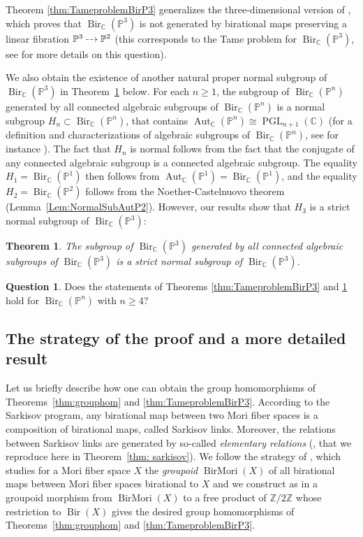 \documentclass[JEP,XML,SOM,Unicode,NoFloatCountersInSection]{cedram}
\newcommand{\dradpl}{{\hspace*{-2mm}\begin{tikzcd}[ampersand replacement=\&,column sep = scriptsize]\mbox{}\ar[r,dashed]\&\mbox{}\end{tikzcd}\hspace*{-2mm}}}
\newcommand{\dratst}{{\hspace*{-2mm}\begin{tikzcd}[ampersand replacement=\&,column sep = small]\mbox{}\ar[r,dashed]\&\mbox{}\end{tikzcd}\hspace*{-2mm}}}
\let\drascst\dratst
\newcommand{\dra}{\mathchoice{\dradpl}{\dratst}{\drascst}{\drascst}}
\DeclareMathOperator{\Bir}{Bir}
\DeclareMathOperator{\Aut}{Aut}
\DeclareMathOperator{\PGL}{PGL}
\DeclareMathOperator{\BirMori}{BirMori}
\theoremstyle{plain}
\newtheorem{maintheorem}{Theorem}
\theoremstyle{definition}
\newtheorem*{question}{Question}
\newcommand{\CC}{\mathbb C}
\newcommand{\PP}{\mathbb P}
\newcommand{\ZZ}{\mathbb Z}
\begin{document}
Theorem \ref{thm:TameproblemBirP3} generalizes the three-dimensional version of \cite[Th.\,C]{BLZ}, which proves that $\Bir_\CC(\PP^3)$ is not generated by birational maps preserving a linear fibration $\PP^3\dra \PP^2$ (this corresponds to the Tame problem for $\Bir_\CC(\PP^3)$, see \cite[\S 1.C]{BLZ} for more details on this question).

We also obtain the existence of another natural proper normal subgroup of $\Bir_{\CC}(\PP^3)$ in Theorem~\ref{Theorem:AlgSubgroups} below. For each $n\ge 1$, the subgroup of $\Bir_{\CC}(\PP^n)$ generated by all connected algebraic subgroups of $\Bir_\CC(\PP^n)$ is a normal subgroup $H_n\subset \Bir_{\CC}(\PP^n)$, that contains $\Aut_{\CC}(\PP^n)\cong\PGL_{n+1}(\CC)$ (for a definition and characterizations of alge\-braic subgroups of $\Bir_{\CC}(\PP^n)$, see for instance \cite{BF13}). The fact that $H_n$ is normal follows from the fact that the conjugate of any connected algebraic subgroup is a connected algebraic subgroup. The equality $H_1=\Bir_{\CC}(\PP^1)$ then follows from $\Aut_{\CC}(\PP^1)=\Bir_{\CC}(\PP^1)$, and the equality $H_2=\Bir_{\CC}(\PP^2)$ follows from the Noether-Castelnuovo theorem (Lemma~\ref{Lem:NormalSubAutP2}). However, our results show that $H_3$ is a strict normal subgroup of $\Bir_{\CC}(\PP^3)$:\enlargethispage{\baselineskip}%

\begin{maintheorem}\label{Theorem:AlgSubgroups}
The subgroup of $\Bir_{\CC}(\PP^3)$ generated by all connected algebraic subgroups of $\Bir_\CC(\PP^3)$ is a strict normal subgroup of $\Bir_{\CC}(\PP^3)$.
\end{maintheorem}

\begin{question}
Does the statements of Theorems \ref{thm:TameproblemBirP3} and \ref{Theorem:AlgSubgroups} hold for $\Bir_\CC(\PP^n)$ with $n\geqslant 4$?
\end{question}

\subsection{The strategy of the proof and a more detailed result}
Let us briefly describe how one can obtain the group homomorphisms of Theorems~\ref{thm:grouphom} and \ref{thm:TameproblemBirP3}. According to the Sarkisov program, any birational map between two Mori fiber spaces is a composition of birational maps, called Sarkisov links. Moreover, the relations between Sarkisov links are generated by so-called \emph{elementary relations} (\cite[Th.\,4.29]{BLZ}, that we reproduce here in Theorem~\ref{thm: sarkisov}). We follow the strategy of \cite{BLZ}, which studies for a Mori fiber space $X$ the \emph{groupoid} $\BirMori(X)$ of all birational maps between Mori fiber spaces birational to $X$ and we construct as in \cite{BLZ} a groupoid morphism from $\BirMori(X)$ to a free product of $\ZZ/2\ZZ$ whose restriction to $\Bir(X)$ gives the desired group homomorphisms of Theorems~\ref{thm:grouphom} and \ref{thm:TameproblemBirP3}.
\end{document}

